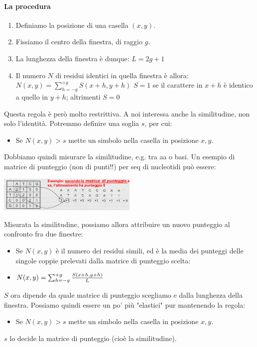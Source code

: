 \documentclass{article}
\begin{document}
\paragraph{La procedura}
\begin{enumerate}
    \item Definiamo la posizione di una casella $(x,y)$.
    \item Fissiamo il centro della finestra, di raggio $g$.
    \item La lunghezza della finestra è dunque: $L= 2g+1$
    \item Il numero $N$ di residui identici in quella finestra è allora: $N(x,y) = \sum^{+g}_{h=-g} S(x + h, y+h)$
        \subitem $S=1$ se il carattere in $x+h$ è identico a quello in $y+h$; altrimenti $S=0$
\end{enumerate}
Questa regola è però molto restrittiva. A noi interessa anche
la similitudine, non solo l'identità. Potremmo definire una soglia $s$, per cui:
\begin{itemize}
    \item Se $N(x,y)>s$ mette un simbolo nella casella in posizione $x,y$.
\end{itemize}
Dobbiamo quindi misurare la similitudine, e.g. tra aa o basi. Un
esempio di matrice di punteggio (non di punti!!) per seq
di nucleotidi può essere:
\begin{center}
    \includegraphics[width=0.5\textwidth]{figures/mat.png}
\end{center}
Misurata la similitudine, possiamo allora attribuire un nuovo punteggio al confronto fra due finestre:
\begin{itemize}
    \item Se $N(x,y)$ è il numero dei residui simili, ed è la media dei punteggi
    delle singole coppie prelevati dalla matrice di punteggio scelta:
    \item $N(x,y) = \sum^{+g}_{h=-g} {S(x + h, y+h)\over L}$
\end{itemize}
$S$ ora dipende da quale matrice di punteggio scegliamo e dalla
lunghezza della finestra. Possiamo quindi essere un po' più "elastici" pur mantenendo
la regola:
\begin{itemize}
    \item Se $N(x,y)>s$ mette un simbolo nella casella in posizione $x,y$.
\end{itemize}
$s$ lo decide la matrice di punteggio (cioè la similitudine).
\end{document}
